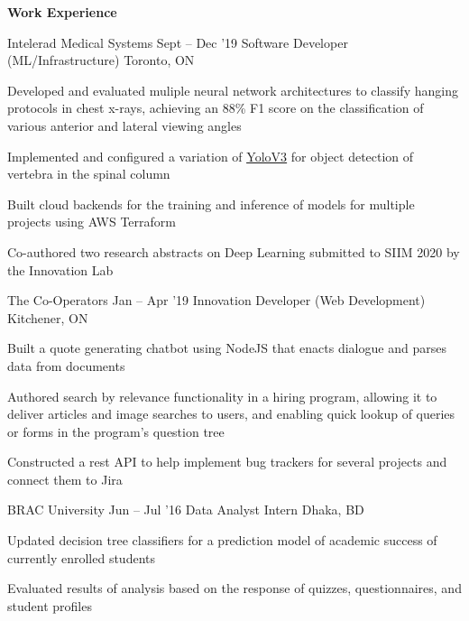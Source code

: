 \documentclass{resume} %
\begin{document}
\begin{rSection}{\textbf{Work Experience}}

  \begin{rSubsection}{Intelerad Medical Systems}
   {Sept -- Dec '19}
   		{Software Developer (ML/Infrastructure)}
		{Toronto, ON}
		\item Developed and evaluated muliple neural network architectures to classify hanging protocols in chest x-rays, achieving an 88\% F1 score on the classification of various anterior and lateral viewing angles
		\item Implemented and configured a variation of {\underline{\href{https://pjreddie.com/media/files/papers/YOLOv3.pdf}{YoloV3}}} for object detection of vertebra in the spinal column
		\item Built cloud backends for the training and inference of models for multiple projects using AWS Terraform
		\item Co-authored two research abstracts on  Deep Learning submitted to SIIM 2020 by the Innovation Lab
	
  \end{rSubsection}

  \begin{rSubsection}{The Co-Operators}
    {Jan -- Apr '19}
         {Innovation Developer (Web Development)}
         {Kitchener, ON}
       \item Built a quote generating chatbot using NodeJS that enacts dialogue and parses data from documents
       \item Authored search by relevance functionality in a hiring program, allowing it to deliver articles and image searches to users, and enabling quick lookup of queries or forms in the program's question tree
        \item Constructed a rest API to help implement bug trackers for several projects and connect them to Jira

  \end{rSubsection}

	\begin{rSubsection}{BRAC University}
		{Jun -- Jul '16}
		{Data Analyst Intern}
		{Dhaka, BD}
		\item Updated decision tree classifiers for a prediction model of academic success of currently enrolled students
		\item Evaluated results of analysis based on the response of quizzes, questionnaires, and student profiles
	\end{rSubsection}
  
\end{rSection} 
\end{document}

